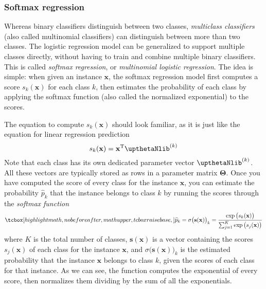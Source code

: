 \subsubsection{Softmax regression}\label{subsubsec:Softmax_regression}
Whereas binary classifiers distinguish between two classes, \emph{multiclass classifiers} (also called multinomial classifiers) can distinguish between more than two classes. The logistic regression model can be generalized to support multiple classes directly, without having to train and combine multiple binary classifiers. This is called \emph{softmax regression}, or \emph{multinomial logistic regression}. The idea is simple: when given an instance $\mathbf{x}$, the softmax regression model first computes a score $s_k(\mathbf{x})$ for each class $k$, then estimates the probability of each class by applying the softmax function (also called the normalized exponential) to the scores.

The equation to compute $s_k(\mathbf{x})$ should look familiar, as it is just like the equation for linear regression prediction
\begin{equation}
s_k(\mathbf{x})=\mathbf{x}^{\mathrm{T}}\boldtheta^{(k)}
\end{equation}
Note that each class has its own dedicated parameter vector $\boldtheta^{(k)}$. All these vectors are typically stored as rows in a parameter matrix $\boldsymbol{\Theta}$. Once you have computed the score of every class for the instance $\mathbf{x}$, you can estimate the probability $\widehat{p}_k$ that the instance belongs to class $k$ by running the scores through the \emph{softmax function}
\begin{equation}
\tcbhighmath{\widehat{p}_k={\sigma\bigl(\mathbf{s}(\mathbf{x})\bigr)}_k=\frac{\exp{\bigl(s_k(\mathbf{x})\bigr)}}{\sum_{j=1}^K\exp{\bigl(s_j(\mathbf{x})\bigr)}}}
\end{equation}
where $K$ is the total number of classes, $\mathbf{s}(\mathbf{x})$ is a vector containing the scores $s_j(\mathbf{x})$ of each class for the instance $\mathbf{x}$, and ${\sigma\bigl(\mathbf{s}(\mathbf{x})\bigr)}_k$ is the estimated probability that the instance $\mathbf{x}$ belongs to class $k$, given the scores of each class for that instance. As we can see, the function computes the exponential of every score, then normalizes them dividing by the sum of all the exponentials.

